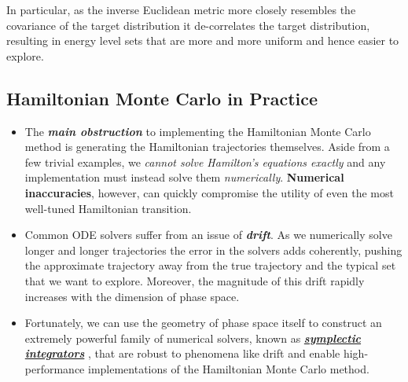 \documentclass[11pt]{article}
\begin{document}
\begin{itemize}
In particular, as the inverse Euclidean metric more closely resembles the covariance of the target distribution it de-correlates the target distribution, resulting in energy level sets that are more and more uniform and hence easier to explore. 
\end{itemize}

\subsection{Hamiltonian Monte Carlo in Practice}
\begin{itemize}
\item The \emph{\textbf{main obstruction}} to implementing the Hamiltonian Monte Carlo method is generating the Hamiltonian trajectories themselves. Aside from a few trivial examples, we \emph{cannot solve Hamilton’s equations exactly} and any implementation must instead solve them \emph{numerically}. \textbf{Numerical inaccuracies}, however, can quickly compromise the utility of even the most well-tuned Hamiltonian transition. 

\item Common ODE solvers suffer from an issue of \emph{\textbf{drift}}. As we numerically solve longer and longer trajectories the error in the solvers adds coherently, pushing the approximate trajectory away from the true trajectory and the typical set that we want to explore. Moreover, the magnitude of this drift rapidly increases with the dimension of phase space.

\item Fortunately, we can use the geometry of phase space itself to construct an extremely powerful family of numerical solvers, known as \underline{\emph{\textbf{symplectic integrators}}} \citep{liu2001monte, leimkuhler2004simulating,haier2006geometric,  betancourt2017conceptual, vishnoi2021introduction}, that are robust to phenomena like drift and enable high-performance implementations of the Hamiltonian Monte Carlo method.
\end{itemize}
\end{document}
